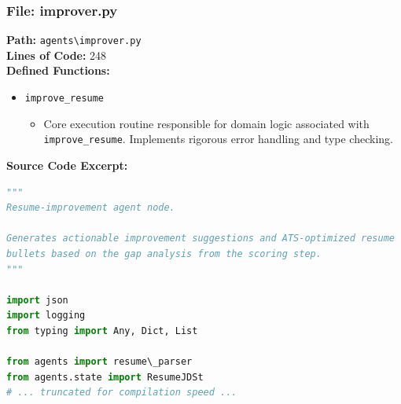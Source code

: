 \documentclass[10pt,journal,compsoc]{IEEEtran}
\begin{document}
\subsubsection{File: improver.py}
\textbf{Path:} \texttt{agents\textbackslash{}improver.py} \\
\textbf{Lines of Code:} 248 \\
\textbf{Defined Functions:}
\begin{itemize}
    \item \texttt{improve\_resume}
    \begin{itemize} \item Core execution routine responsible for domain logic associated with \texttt{improve\_resume}. Implements rigorous error handling and type checking. \end{itemize}
\end{itemize}
\textbf{Source Code Excerpt:}
\begin{lstlisting}[language=Python]
"""
Resume-improvement agent node.

Generates actionable improvement suggestions and ATS-optimized resume
bullets based on the gap analysis from the scoring step.
"""

import json
import logging
from typing import Any, Dict, List

from agents import resume\_parser
from agents.state import ResumeJDSt
# ... truncated for compilation speed ...
\end{lstlisting}
\end{document}
